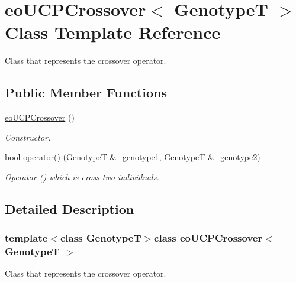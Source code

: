 \hypertarget{classeo_u_c_p_crossover}{\section{eo\-U\-C\-P\-Crossover$<$ \-Genotype\-T $>$ \-Class \-Template \-Reference}
\label{classeo_u_c_p_crossover}
}


\-Class that represents the crossover operator.  


\subsection*{\-Public \-Member \-Functions}
\begin{DoxyCompactItemize}
\item 
\hyperlink{classeo_u_c_p_crossover_ad6d7cb788ab6b6e12544e82bcc1ff3bd}{eo\-U\-C\-P\-Crossover} ()
\begin{DoxyCompactList}\small\item\em \-Constructor. \end{DoxyCompactList}\item 
bool \hyperlink{classeo_u_c_p_crossover_ab95700d2ec3f8a8d5fe6abd6a5ca4e8b}{operator()} (\-Genotype\-T \&\-\_\-genotype1, \-Genotype\-T \&\-\_\-genotype2)
\begin{DoxyCompactList}\small\item\em \-Operator () which is cross two individuals. \end{DoxyCompactList}\end{DoxyCompactItemize}


\subsection{\-Detailed \-Description}
\subsubsection*{template$<$class Genotype\-T$>$class eo\-U\-C\-P\-Crossover$<$ Genotype\-T $>$}

\-Class that represents the crossover operator. 


